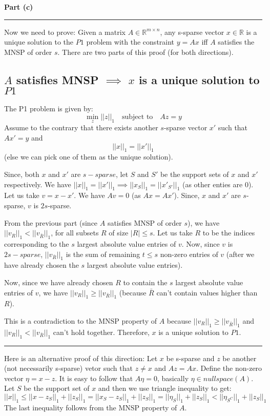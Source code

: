 \documentclass[a4paper,12pt]{article}
\newenvironment{solution}[2][]{%
    \begin{mdframed}[linecolor=blue!70!black, linewidth=2pt, roundcorner=10pt, backgroundcolor=yellow!10!white, skipabove=12pt, skipbelow=12pt]%
        \textbf{\large #2}
        \par\noindent\rule{\textwidth}{0.4pt}
}{
    \end{mdframed}
}
\begin{document}
\begin{solution}{Part (c)}
  Now we need to prove:
  Given a matrix $A \in \mathbb{R}^{m\times n}$, any s-sparse vector $x \in \mathbb{R}$ is a unique solution to the $P1$ problem with the constraint $y = Ax$ iff $A$ satisfies the MNSP of order $s$. There are two parts of this proof (for both directions).

  \subsection*{$A$ satisfies MNSP $\implies$ $x$ is a unique solution to $P1$}
  The P1 problem is given by:
  \[
    \min_{z}||z||_1 \quad \text{subject to} \quad Az = y
  \]
  Assume to the contrary that there exists another $s$-sparse vector $x'$ such that $Ax' = y$ and $$||x||_1 = ||x'||_1$$ (else we can pick one of them as the unique solution). 

  Since, both $x$ and $x'$ are $s-sparse$, let $S$ and $S'$ be the support sets of $x$ and $x'$ respectively. We have $||x||_1 = ||x'||_1 \implies ||x_S||_1 = ||x'_{S'}||_1$ (as other enties are 0). Let us take $v = x - x'$. We have $Av = 0$ (as $Ax = Ax'$). Since, $x$ and $x'$ are $s$-sparse, $v$ is $2s$-sparse. 

  From the previous part (since $A$ satisfies MNSP of order $s$), we have $||v_R||_1 < ||v_{\bar{R}}||_1$, for all subsets $R$ of size $|R| \leq s$. Let us take $R$ to be the indices corresponding to the $s$ largest absolute value entries of $v$. Now, since $v$ is $2s-sparse$, $||v_{\bar{R}}||_1$ is the sum of remaining $t \leq s$ non-zero entries of $v$ (after we have already chosen the $s$ largest absolute value entries).
  
  Now, since we have already chosen $R$ to contain the $s$ largest absolute value entries of $v$, we have $||v_R||_1 \geq ||v_{\bar{R}}||_1$ (because $\bar{R}$ can't contain values higher than $R$). 
  
  This is a contradiction to the MNSP property of $A$ because $||v_R||_1 \geq ||v_{\bar{R}}||_1$ and $||v_R||_1 < ||v_{\bar{R}}||_1$ can't hold together. Therefore, $x$ is a unique solution to $P1$.
  \vspace{0.5cm}
  \hrule
  \vspace{0.5cm}
  Here is an alternative proof of this direction:
  Let $x$ be s-sparse and $z$ be another (not necessarily s-sparse) vetor such that $z \neq x$ and $Az = Ax$. Define the non-zero vector $\eta = x - z$. It is easy to follow that $A\eta = 0$, basically $\eta \in nullspace(A)$. Let $S$ be the support set of $x$ and then we use triangle inequality to get:
  \[
  ||x||_1 \leq ||x - z_S||_1 + ||z_S||_1 = ||x_S - z_S||_1 + ||z_S||_1 = ||\eta_S||_1 + ||z_S||_1 < ||\eta_{S^C}||_1 + ||z_S||_1  
  \]
  The last inequality follows from the MNSP property of $A$. 


\end{solution}
\end{document}
